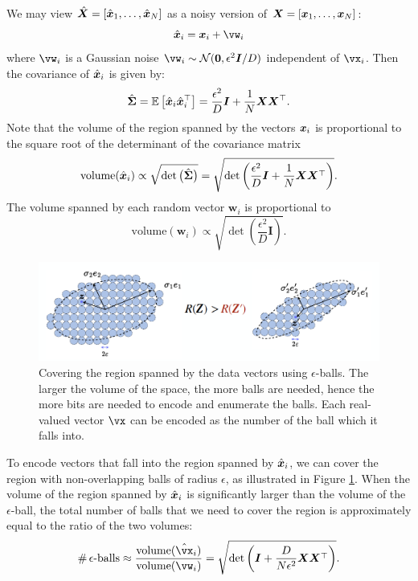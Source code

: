 \documentclass[../../book-main.tex]{subfiles}
\begin{document}
We may view $\hat {\bm{X}} = [\hat {\bm{x}}_1,\ldots, \hat {\bm{x}}_N]$ as a noisy version of $\bm{X} = [\bm{x}_1, \ldots, \bm{x}_N]$:
\begin{equation}
	\hat \x_i = \x_i + \vw_i
\end{equation}
where $\vw_i$ is a Gaussian noise $\vw_i  \sim \mathcal{N}(\boldsymbol{0} , {\epsilon^2}  \boldsymbol{I}/{D})$ independent of $\vx_i$. Then the covariance of $\hat {\bm{x}}_i$ is given by:
\begin{equation}
	\hat{\boldsymbol{\Sigma}} = \mathbb{E}\left[\hat {\bm{x}}_i \hat {\bm{x}}_i^\top\right] = \frac{\epsilon^2}{D} \boldsymbol{I} + \frac{1}{N} \bm{X}\bm{X}^\top.
\end{equation}
Note that the volume of the region spanned by the vectors $\bm{x}_i$ is proportional to the square root of the determinant of the
covariance matrix
\begin{equation}
	\mbox{volume}(\hat {\bm{x}}_i) \propto \sqrt{\det \big(\hat{\boldsymbol{\Sigma}}\big)} = \sqrt{\det\left(\frac{\epsilon^2}{D} \boldsymbol{I} + \frac{1}{N} \bm{X}\bm{X}^\top \right)}.
\end{equation}
The volume spanned by each random vector $\boldsymbol{w}_i$ is
proportional to
\begin{equation}
	\mbox{volume}(\boldsymbol{w}_i) \propto   \sqrt{\det\left(\frac{\epsilon^2}{D} \boldsymbol{I} \right)}.
\end{equation}

\begin{figure}
	\centering
	\includegraphics[width=\linewidth]{chapters/chapter3/figs/Gaussian-compression.png}
	\caption{Covering the region spanned by the data vectors using $\epsilon$-balls. The larger the volume of the space, the more balls are needed, hence the more bits are needed to encode and enumerate the balls. Each real-valued vector $\vx$ can be encoded as the number of the ball which it falls into.}
	\label{fig:ball-packing}
\end{figure}

To encode vectors that fall into the region spanned by $\hat {\bm{x}}_i$, we can cover the region with non-overlapping
balls of radius $\epsilon$, as illustrated in Figure \ref{fig:ball-packing}. When the volume of the region spanned by $\hat {\bm{x}}_i$ is significantly larger than the volume of the $\epsilon$-ball, the total number of balls that we need to cover the region is
approximately equal to the ratio of the two volumes:
\begin{equation}
	\# \,\epsilon\mbox{-balls} \approx \frac{\mbox{volume}(\hat \vx_i)}{\mbox{volume}(\vw_i)} = \sqrt{\det\left(\boldsymbol{I} + \frac{D}{N\epsilon^2} \X\X^\top  \right)}.
\end{equation}
\end{document}
